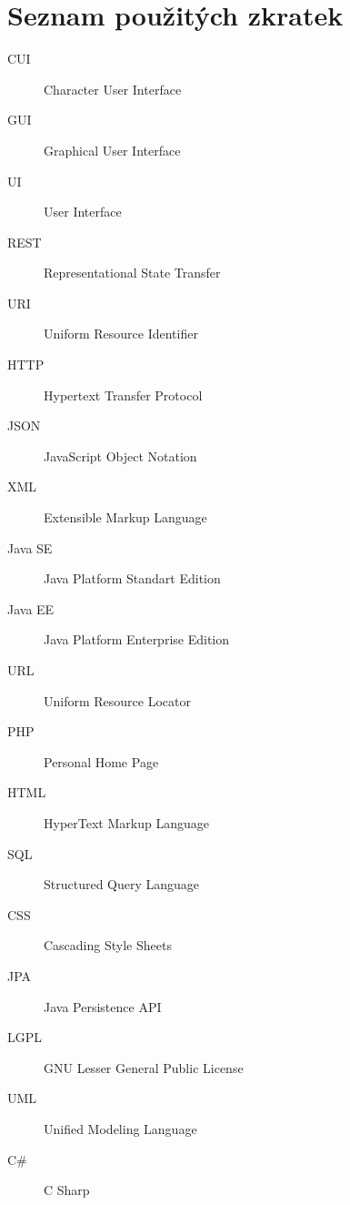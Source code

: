 \chapter{Seznam použitých zkratek}

\begin{description}
\item[CUI] Character User Interface
\item[GUI] Graphical User Interface
\item[UI] User Interface
\item[REST] Representational State Transfer
\item[URI] Uniform Resource Identifier
\item[HTTP] Hypertext Transfer Protocol
\item[JSON] JavaScript Object Notation
\item[XML] Extensible Markup Language
\item[Java SE] Java Platform Standart Edition
\item[Java EE] Java Platform Enterprise Edition
\item[URL] Uniform Resource Locator
\item[PHP] Personal Home Page
\item[HTML] HyperText Markup Language
\item[SQL] Structured Query Language
\item[CSS] Cascading Style Sheets
\item[JPA] Java Persistence API
\item[LGPL] GNU Lesser General Public License 
\item[UML] Unified Modeling Language
\item[C\#] C Sharp


\end{description}